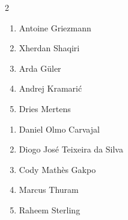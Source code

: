 \documentclass[11pt]{article}
\begin{document}
\begin{multicols}{2}
\begin{samepage}
\begin{tcolorbox}[evalbox,title=\textbf{Lionel Messi (Right Center Forward)} \hfill Score:\ \rule{1cm}{0.4pt}]
\begin{enumerate}
\item Antoine Griezmann
\item Xherdan Shaqiri
\item Arda Güler
\item Andrej Kramarić
\item Dries Mertens
\end{enumerate}
\end{tcolorbox}
\end{samepage}

\begin{samepage}
\begin{tcolorbox}[evalbox,title=\textbf{Kylian Mbappé (Left Wing)} \hfill Score:\ \rule{1cm}{0.4pt}]
\begin{enumerate}
\item Daniel Olmo Carvajal
\item Diogo José Teixeira da Silva
\item Cody Mathès Gakpo
\item Marcus Thuram
\item Raheem Sterling
\end{enumerate}
\end{tcolorbox}
\end{samepage}

\end{multicols}
\end{document}
